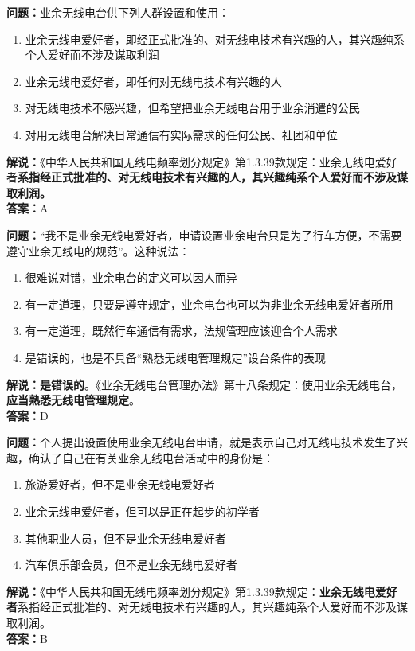 \documentclass{ctexbook}
\begin{document}
\bigskip


\noindent\textbf{问题：}业余无线电台供下列人群设置和使用：
\begin{enumerate}[label=\Alph*), leftmargin=3em]
	\item 业余无线电爱好者，即经正式批准的、对无线电技术有兴趣的人，其兴趣纯系个人爱好而不涉及谋取利润
	\item 业余无线电爱好者，即任何对无线电技术有兴趣的人
	\item 对无线电技术不感兴趣，但希望把业余无线电台用于业余消遣的公民
	\item 对用无线电台解决日常通信有实际需求的任何公民、社团和单位
\end{enumerate}
\noindent\textbf{解说：}《中华人民共和国无线电频率划分规定》第1.3.39款规定：业余无线电爱好者\textbf{系指经正式批准的、对无线电技术有兴趣的人，其兴趣纯系个人爱好而不涉及谋取利润。}\\\noindent\textbf{答案：}A

\bigskip


\noindent\textbf{问题：}“我不是业余无线电爱好者，申请设置业余电台只是为了行车方便，不需要遵守业余无线电的规范”。这种说法：
\begin{enumerate}[label=\Alph*), leftmargin=3em]
	\item 很难说对错，业余电台的定义可以因人而异
	\item 有一定道理，只要是遵守规定，业余电台也可以为非业余无线电爱好者所用
	\item 有一定道理，既然行车通信有需求，法规管理应该迎合个人需求
	\item 是错误的，也是不具备“熟悉无线电管理规定”设台条件的表现
\end{enumerate}
\noindent\textbf{解说：}\textbf{是错误的}。《业余无线电台管理办法》第十八条规定：使用业余无线电台，\textbf{应当熟悉无线电管理规定}。\\\noindent\textbf{答案：}D


\bigskip


\noindent\textbf{问题：}个人提出设置使用业余无线电台申请，就是表示自己对无线电技术发生了兴趣，确认了自己在有关业余无线电台活动中的身份是：
\begin{enumerate}[label=\Alph*), leftmargin=3em]
	\item 旅游爱好者，但不是业余无线电爱好者
	\item 业余无线电爱好者，但可以是正在起步的初学者
	\item 其他职业人员，但不是业余无线电爱好者
	\item 汽车俱乐部会员，但不是业余无线电爱好者
\end{enumerate}
\noindent\textbf{解说：}《中华人民共和国无线电频率划分规定》第1.3.39款规定：\textbf{业余无线电爱好者}系指经正式批准的、对无线电技术有兴趣的人，其兴趣纯系个人爱好而不涉及谋取利润。\\\noindent\textbf{答案：}B
\end{document}
